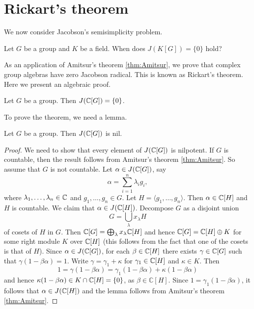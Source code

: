 \section{Rickart's theorem}

We now consider Jacobson's semisimplicity problem. 

\begin{question}
\label{Jacobson semisimplicity problem}
Let $G$ be a group and $K$ be a field. When does $J(K[G])=\{0\}$ hold?
\end{question}

As an application of Amitsur's theorem \ref{thm:Amitsur}, 
we prove that 
complex group algebras have zero Jacobson radical.
This is known as 
Rickart's theorem. Here 
we present an algebraic proof. 

\begin{theorem}[Rickart]
\label{thm:Rickart}
    Let $G$ be a group. Then $J(\mathbb{C}[G])=\{0\}$.
\end{theorem}

To prove the theorem, we need a lemma.

\begin{lemma}
Let $G$ be a group. Then $J(\mathbb{C}[G])$ is nil.        
\end{lemma}

\begin{proof}
    We need to show that every element of $J(\mathbb{C}[G])$ is nilpotent. 
    If $G$ is countable, then the result follows from Amitsur's theorem \ref{thm:Amitsur}. So assume that 
    $G$ is not countable. Let $\alpha\in J(\mathbb{C}[G])$, say
    \[
    \alpha=\sum_{i=1}^n\lambda_ig_i,
    \]
    where $\lambda_1,\dots,\lambda_n\in\mathbb{C}$ and $g_1,\dots,g_n\in G$. Let $H=\langle g_1,\dots,g_n\rangle$.
    Then $\alpha\in \mathbb{C}[H]$ and $H$ is countable. We claim that $\alpha\in J(\mathbb{C}[H])$. Decompose
    $G$ as a disjoint union 
    \[
    G=\bigcup_\lambda x_\lambda H
    \]
    of cosets of $H$ in $G$. Then $\mathbb{C}[G]=\bigoplus_\lambda x_\lambda\mathbb{C}[H]$ and
    hence $\mathbb{C}[G]=\mathbb{C}[H]\oplus K$ for some right module $K$ over $\mathbb{C}[H]$ (this follows
    from the fact that one of the cosets is that of $H$). Since $\alpha\in J(\mathbb{C}[G])$, for each 
    $\beta\in\mathbb{C}[H]$ there exists $\gamma\in\mathbb{C}[G]$ such that 
    $\gamma(1-\beta\alpha)=1$. Write $\gamma=\gamma_1+\kappa$ for $\gamma_1\in\mathbb{C}[H]$ and $\kappa\in K$. Then
    \[
    1=\gamma(1-\beta\alpha)=\gamma_1(1-\beta\alpha)+\kappa(1-\beta\alpha)
    \]
    and hence $\kappa(1-\beta\alpha)\in K\cap \mathbb{C}[H]=\{0\}$, as $\beta\in\mathbb{C}[H]$. 
    Since $1=\gamma_1(1-\beta\alpha)$, it follows that
    $\alpha\in J(\mathbb{C}[H])$ and the lemma follows from Amitsur's theorem \ref{thm:Amitsur}.  
\end{proof}

